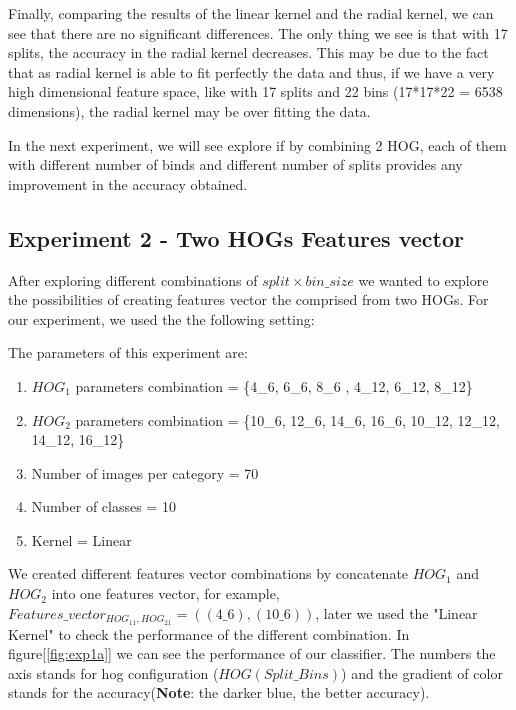 Finally, comparing the results of the linear kernel and the radial kernel, we can see that there are no significant differences. The only thing we see is that with 17 splits, the accuracy in the radial kernel decreases. This may be due to the fact that as radial kernel is able to fit perfectly the data and thus, if we have a very high dimensional feature space, like with 17 splits and 22 bins (17*17*22 = 6538 dimensions), the radial kernel may be over fitting the data. 


In the next experiment, we will see explore if by combining 2 HOG, each of them with different number of binds and different number of splits provides any improvement in the accuracy obtained. 

\subsection{Experiment 2 - Two HOGs Features vector}
After exploring different combinations of $split\times bin\_size$ we wanted to explore the possibilities of creating features vector the comprised from two HOGs. For our experiment, we used the the following setting:

The parameters of this experiment are:
\begin{enumerate}
    \item $HOG_1$ parameters combination = \{4\_6, 6\_6, 8\_6 , 4\_12, 6\_12, 8\_12\}
    \item $HOG_2$ parameters combination = \{10\_6, 12\_6, 14\_6, 16\_6, 10\_12, 12\_12, 14\_12, 16\_12\}
    \item Number of images per category = 70
    \item Number of classes = 10
    \item Kernel = Linear 
\end{enumerate}

We created different features vector combinations by concatenate $HOG_1$ and $HOG_2$ into one features vector, for example, $Features\_vector_{HOG_{11},HOG_{21}} = ((4\_6), (10\_6))$, later we used the "Linear Kernel" to check the performance of the different combination. In figure[\ref{fig:exp1a}] we can see the performance of our classifier. The numbers the axis stands for hog configuration ($HOG(Split\_Bins)$) and the gradient of color stands for the accuracy(\textbf{Note}: the darker blue, the better accuracy). 

